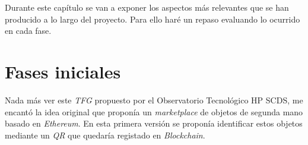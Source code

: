 
Durante este capítulo se van a exponer los aspectos más relevantes que se han producido a lo largo del proyecto. Para ello haré un repaso evaluando lo ocurrido en cada fase.

\section{Fases iniciales}
Nada más ver este \textit{TFG} propuesto por el Observatorio Tecnológico HP SCDS, me encantó la idea original que proponía un \textit{marketplace} de objetos de segunda mano basado en \textit{Ethereum}. En esta primera versión se proponía identificar estos objetos mediante un \textit{QR} que quedaría registado en \textit{Blockchain}.

